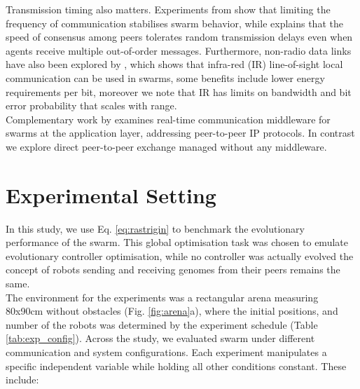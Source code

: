 \documentclass[conference]{IEEEtran}
\begin{document}
Transmission timing also matters. Experiments from \cite{aust_hidden_2022} show that limiting the frequency of communication stabilises swarm behavior, while \cite{tsianos_impact_2012} explains that the speed of consensus among peers tolerates random transmission delays even when agents receive multiple out-of-order messages. Furthermore, non-radio data links have also been explored by \cite{trenkwalder_swarmcom_2020}, which shows that infra-red (IR) line-of-sight local communication can be used in swarms, some benefits include lower energy requirements per bit, moreover we note that IR has limits on bandwidth and bit error probability that scales with range. \\ 

Complementary work by \cite{rabbah_real_2021} examines real-time communication middleware for swarms at the application layer, addressing peer-to-peer IP protocols. In contrast we explore direct peer-to-peer exchange managed without any middleware. \\



\section{Experimental Setting}

In this study, we use Eq. \ref{eq:rastrigin} to benchmark the evolutionary performance of the swarm. This global optimisation task was chosen to emulate evolutionary controller optimisation, while no controller was actually evolved the concept of robots sending and receiving genomes from their peers remains the same. \\

The environment for the experiments was a rectangular arena measuring 80x90cm without obstacles (Fig. \ref{fig:arena}a), where the initial positions, and number of the robots was determined by the experiment schedule (Table \ref{tab:exp_config}). Across the study, we evaluated swarm under different communication and system configurations. Each experiment manipulates a specific independent variable while holding all other conditions constant. These include:\\
\end{document}
